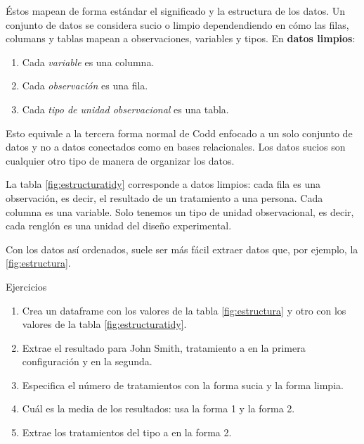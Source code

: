 \documentclass[]{article}
\begin{document}
Éstos mapean de forma estándar el significado y la estructura de los
datos. Un conjunto de datos se considera sucio o limpio dependendiendo
en cómo las filas, columans y tablas mapean a observaciones, variables y
tipos. En \textbf{datos limpios}:

\begin{enumerate}
\def\labelenumi{\arabic{enumi}.}
\itemsep1pt\parskip0pt
\item
  Cada \emph{variable} es una columna.
\item
  Cada \emph{observación} es una fila.
\item
  Cada \emph{tipo de unidad observacional} es una tabla.
\end{enumerate}

Esto equivale a la tercera forma normal de Codd enfocado a un solo
conjunto de datos y no a datos conectados como en bases relacionales.
Los datos sucios son cualquier otro tipo de manera de organizar los
datos.

La tabla \ref{fig:estructuratidy} corresponde a datos limpios: cada fila
es una observación, es decir, el resultado de un tratamiento a una
persona. Cada columna es una variable. Solo tenemos un tipo de unidad
observacional, es decir, cada renglón es una unidad del diseño
experimental.

Con los datos así ordenados, suele ser más fácil extraer datos que, por
ejemplo, la \ref{fig:estructura}.

\renewcommand\bcStyleTitre[1]{\large\textcolor{bbblack}{#1}}

\begin{bclogo}[
  couleur=llred,
  arrondi=0,
  logo=\bcstop,
  barre=none,
  noborder=true]{Ejercicios}
\begin{enumerate}
\item Crea un dataframe con los valores de la tabla \ref{fig:estructura} y otro 
con los valores de la tabla \ref{fig:estructuratidy}.
\item Extrae el resultado para John Smith, tratamiento a en la primera configuración y en la segunda.
\item Especifica el número de tratamientos con la forma sucia y la forma limpia.
\item Cuál es la media de los resultados: usa la forma 1 y la forma 2.
\item Extrae los tratamientos del tipo a en la forma 2.
\end{enumerate}

\end{bclogo}
\end{document}
